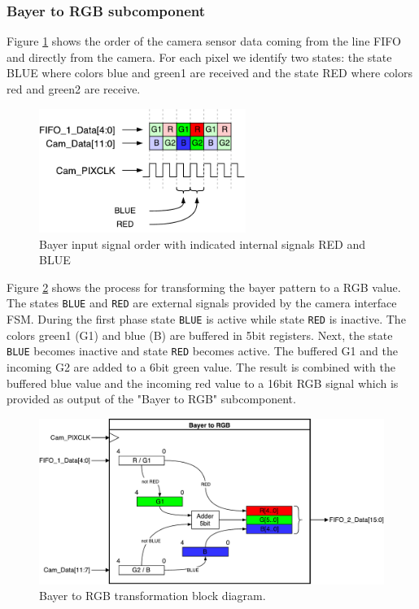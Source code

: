\documentclass{article}
\begin{document}
\subsubsection{Bayer to RGB subcomponent}
Figure \ref{fig:bayer_phase} shows the order of the camera sensor data coming from the line FIFO and directly from the camera. For each pixel we identify two states: the state BLUE where colors blue and green1 are received and the state RED where colors red and green2 are receive.
\begin{figure}[H]
\centering
\includegraphics[width=0.6\textwidth]{img/BayerCombinePhase.pdf}
\caption{Bayer input signal order with indicated internal signals RED and BLUE}
\label{fig:bayer_phase}
\end{figure}

Figure \ref{fig:bayer_to_rgb_component} shows the process for transforming the bayer pattern to a RGB value. The states \verb'BLUE' and \verb'RED' are external signals provided by the camera interface FSM. During the first phase state \verb'BLUE' is active while state \verb'RED' is inactive. The colors green1 (G1) and blue (B) are buffered in 5bit registers. Next, the state \verb'BLUE' becomes inactive and state \verb'RED' becomes active. The buffered G1 and the incoming G2 are added to a 6bit green value. The result is combined with the buffered blue value and the incoming red value to a 16bit RGB signal which is provided as output of the "Bayer to RGB" subcomponent.
\begin{figure}[H]
\centering
\includegraphics[width=\textwidth]{img/CameraInterfaceBayerToRGB.pdf}
\caption{Bayer to RGB transformation block diagram.}
\label{fig:bayer_to_rgb_component}
\end{figure}
\end{document}
